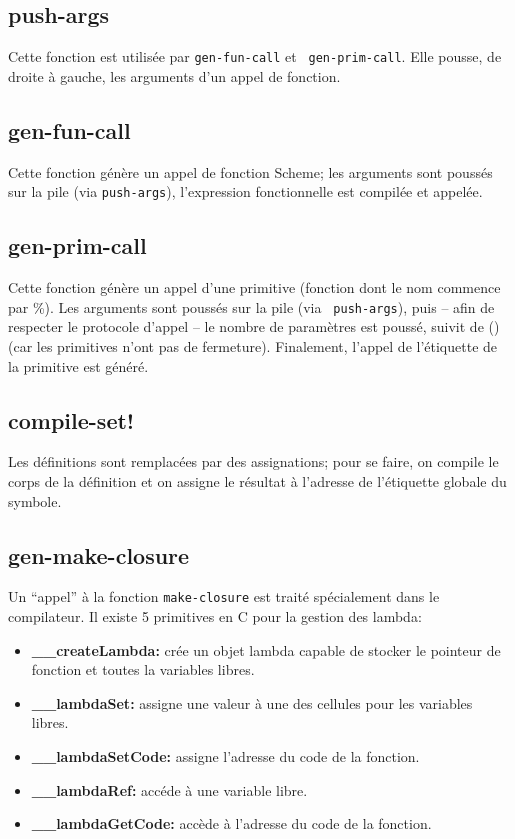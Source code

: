 \documentclass[10pt]{report}
\begin{document}
\subsection{push-args}

Cette fonction est utilisée par {\tt gen-fun-call} et {\tt
  gen-prim-call}.  Elle pousse, de droite à gauche, les arguments d'un
appel de fonction.

\subsection{gen-fun-call}

Cette fonction génère un appel de fonction Scheme; les arguments sont
poussés sur la pile (via {\tt push-args}), l'expression fonctionnelle
est compilée et appelée.

\subsection{gen-prim-call}

Cette fonction génère un appel d'une primitive (fonction dont le nom
commence par \%).  Les arguments sont poussés sur la pile (via {\tt
  push-args}), puis -- afin de respecter le protocole d'appel -- le
nombre de paramètres est poussé, suivit de () (car les primitives
n'ont pas de fermeture).  Finalement, l'appel de l'étiquette de la
primitive est généré.

\subsection{compile-set!}

Les définitions sont remplacées par des assignations; pour se faire,
on compile le corps de la définition et on assigne le résultat à
l'adresse de l'étiquette globale du symbole.

\subsection{gen-make-closure}

Un ``appel'' à la fonction {\tt make-closure} est traité spécialement
dans le compilateur.  Il existe 5 primitives en C pour la gestion des
lambda:

\begin{itemize}
\item {\bf __createLambda:} crée un objet lambda capable de stocker le
  pointeur de fonction et toutes la variables libres.
\item {\bf __lambdaSet:} assigne une valeur à une des cellules pour
  les variables libres.
\item {\bf __lambdaSetCode:} assigne l'adresse du code de la fonction.
\item {\bf __lambdaRef:} accéde à une variable libre.
\item {\bf __lambdaGetCode:} accède à l'adresse du code de la fonction.
\end{itemize}
\end{document}
